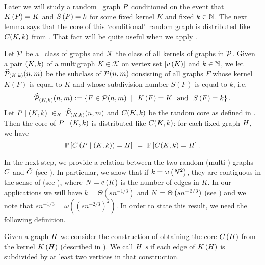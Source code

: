 Later we will study a random \pl\ graph $P$ conditioned on the event that $K\left(P\right)=K$ and $S\left(P\right)=k$ for some fixed kernel $K$ and fixed $k \in \mathbb{N}$. The next lemma says that the core of this \lq conditional\rq\ random graph is distributed like $C(K, k)$ from . That fact will be quite useful when we apply .

\begin{lem}\label{CBrem:core_equal}
Let $\mathcal{P}$ be a \pl\ class of graphs and $\mathcal{K}$ the class of all kernels of graphs in $\mathcal{P}$. Given a pair $(K, k)$ of a multigraph $K\in \mathcal{K}$ on vertex set $[v\left({K}\right)]$ and $k \in \mathbb{N}$, we let $\widehat {\mathcal{P}}_{(K, k)}(n,m)$ be the subclass of $\mathcal{P}(n,m)$ consisting of all graphs $F$ whose kernel $K(F)$ is equal to $K$ and whose subdivision number $S(F)$ is equal to $k$, i.e. 
\[\widehat \planarClass_{(K, \nd)}(n,m):=\left\{F\in \planarClass(n,m) \ \mid\ \kernel{F}=K \ \ \text{and}\ \ \subdivisionNumber{F}=\nd\right\}.\]
Let $P \mid \left(K, k\right)\ \in_R \ \widehat {\mathcal{P}}_{(K, k)}(n,m)$ and $C(K, k)$ be the random core as defined in . Then the core of $P \mid \left(K, k\right)$ is distributed like $C(K, k)$: for each fixed graph $H$, we have
\[
\mathbb{P}\left[C\left(P \mid \left(K, k\right)\right)=H\right]\ =\ \mathbb{P}\left[C(K, k)=H\right].
\]
\end{lem}

In the next step, we provide a relation between the two random (multi-) graphs $C$ and $\tilde{C}$ (see ). In particular, we show that if $k=\omega\left(N^2\right)$, they are contiguous in the sense of  (see ), where $N=e\left({K}\right)$ is the number of edges in $K$. In our applications we will have $k=\Theta\left(sn^{-1/3}\right)$ and $N=\Theta\left(sn^{-2/3}\right)$ (see ) and we note that $sn^{-1/3}=\omega\left(\left(sn^{-2/3}\right)^2\right)$. In order to state this result, we need the following definition.

\begin{definition}[\2s]
Given a graph $H$ we consider the construction of obtaining the core $C\left(H\right)$ from the kernel $K\left(H\right)$ (described in ). We call $H$ {\em \2s} if each edge of $K\left(H\right)$ is subdivided by at least two vertices in that construction.
\end{definition}

